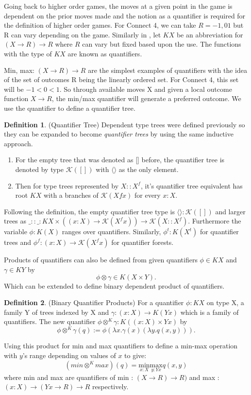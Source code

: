\documentclass[12pt]{article}
\theoremstyle{definition}
\newtheorem{definition}{Definition}[section]
\begin{document}
Going back to higher order games, the moves at a given point in the game is dependent on the prior moves made and the notion as a quantifier is required for the definition of higher order games. For Connect 4, we can take $R = {-1, 0 1}$ but R can vary depending on the game. Similarly in \cite{escardo2022higher}, let $K X$ be an abbreviation for $(X \rightarrow R) \rightarrow R$ where $R$ can vary but fixed based upon the use. The functions with the type of $K X$ are known as quantifiers.

Min, max: $(X \rightarrow R) \rightarrow R$ are the simplest examples of quantifiers with the idea of the set of outcomes R being the linearly ordered set. For Connect 4, this set will be $-1 < 0 < 1$. So through available moves X and given a local outcome function $X \rightarrow R$, the min/max quantifier will generate a preferred outcome. We use the quantifier to define a quantifier tree.

\begin{definition}(Quantifier Tree) 
Dependent type trees were defined previously so they can be expanded to become \emph{quantifier trees}  by using the same inductive approach. 
\begin{enumerate}
\item For the empty tree that was denoted as [] before, the quantifier tree is denoted by type $\mathcal{K}([])$ with $\langle \rangle$ as the only element. 
\item Then for type trees represented by $X :: X^f$, it's quantifier tree equivalent has root $K X$ with a branches of $\mathcal{K}(Xf x)$ for every $x : X$.
\end{enumerate}
Following the definition, the empty quantifier tree type is $\langle \rangle : \mathcal{K}([])$ and larger trees as $\_::\_ : K X \times ((x : X) \rightarrow \mathcal{K}(X^fx)) \rightarrow \mathcal{K}(X :: X^f)$.
Furthermore the variable $\phi : K(X)$ ranges over quantifiers. Similarly, $\phi^t : K(X^t)$ for quantifier trees and $\phi^f : (x : X) \rightarrow \mathcal{K}(X^fx)$ for quantifier forests.
\end{definition}

Products of quantifiers \cite{escardo2010selection} can also be defined from given quantifiers $\phi \in K X$ and $\gamma \in K Y$ by $$\phi \otimes \gamma \in K(X \times Y).$$
Which can be extended to define binary dependent product of quantifiers. 
\begin{definition}(Binary Quantifier Products)
For a quantifier $\phi : K X$ on type X, a family Y of trees indexed by X and $\gamma : (x : X) \rightarrow K (Y x)$ which is a family of quantifiers. The new quantifier $\phi \otimes^K \gamma : K((x : X) \times Yx)$ by
$$\phi \otimes^K \gamma(q) := \phi(\lambda x.\gamma(x)(\lambda y.q(x, y))).$$
\end{definition}
Using this product for min and max quantifiers to define a min-max operation with $y$'s range depending on values of $x$ to give: 
$$(min\otimes^Kmax)(q) = \underset{x : X}{\text{min}} \underset{y : Y x}{\text{max}} q(x , y)$$
where min and max are quantifiers of min : $( X \rightarrow R) \rightarrow R)$ and max : $ (x : X) \rightarrow (Yx \rightarrow R) \rightarrow R$ respectively.
\end{document}
